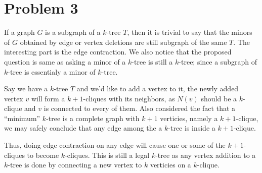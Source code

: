\documentclass[11pt]{article}
\begin{document}
\section*{Problem 3}

If a graph $G$ is a subgraph of a $k$-tree $T$, then it is trivial to say that the minors of $G$ obtained by edge or vertex deletions are still subgraph of the same $T$. The interesting part is the edge contraction. We also notice that the proposed question is same as asking a minor of a $k$-tree is still a $k$-tree; since a subgraph of $k$-tree is essentialy a minor of $k$-tree. \newline


Say we have a $k$-tree $T$ and we'd like to add a vertex to it, the newly added vertex $v$ will form a $k+1$-cliques with its neighbors, as $N(v)$ should be a $k$-clique and $v$ is connected to every of them. Also considered the fact that a ``minimum'' $k$-tree is a complete graph with $k+1$ verticies, namely a $k+1$-clique, we may safely conclude that any edge among the a $k$-tree is inside a $k+1$-clique.

Thus, doing edge contraction on any edge will cause one or some of the $k+1$-cliques to become $k$-cliques. This is still a legal $k$-tree as any vertex addition to a $k$-tree is done by connecting a new vertex to $k$ verticies on a $k$-clique.
\end{document}
